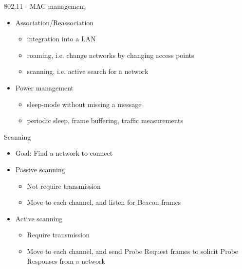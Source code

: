 \documentclass[pdf]{beamer}
\begin{document}
\begin{frame}{802.11 - MAC management}
  \begin{itemize}
  \item Association/Reassociation
    \begin{itemize}
    \item integration into a LAN   
    \item roaming, i.e. change networks by changing access points
    \item scanning, i.e. active search for a network
    \end{itemize}  
  \item Power management
    \begin{itemize}
    \item sleep-mode without missing a message    
    \item periodic sleep, frame buffering, traffic measurements
    \end{itemize}
  \end{itemize}
\end{frame}


\begin{frame}{Scanning }
  \begin{itemize}
  \item Goal: Find a network to connect
  \item  Passive scanning
    \begin{itemize}
    \item  Not require transmission   
    \item  Move to each channel, and listen for Beacon frames
    \end{itemize}
  \item Active scanning
    \begin{itemize}
    \item Require transmission   
    \item Move to each channel, and send Probe Request frames to solicit Probe Responses from a network
    \end{itemize}
  \end{itemize}
\end{frame}
\end{document}
